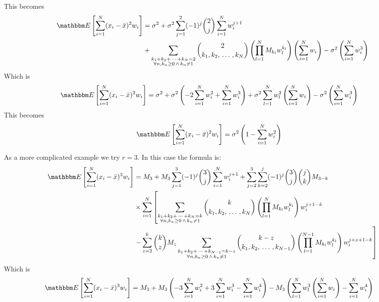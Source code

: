 \documentclass{article}
\newcommand{\E}[1]{\mathbbm E\left[#1\right]}
\begin{document}
This becomes
\begin{align}
    \E{\sum_{i=1}^N (x_i - {\bar x})^2 w_i} &= \sigma^2 + \sigma^2 \sum_{j=1}^2  (-1)^j \binom{2}{j} \sum_{i=1}^N w_i^{j+1} \\\nonumber 
     & + \sum_{\substack{k_1 + k_2 + \, \cdots \, + k_N = 2 \\ \forall n, k_n \ge 0 \, \wedge \, k_n \neq 1 }} \binom{2}{k_1, k_2,\, \ldots\, , k_N} 
     \left(\prod_{l=1}^N M_{k_l} w_l^{k_l}\right) \left(\sum_{i=1}^N w_i \right)  - \sigma^2  \left(\sum_{i=1}^N w_i^{3} \right) 
\end{align}
Which is
\begin{align}
    \E{\sum_{i=1}^N (x_i - {\bar x})^2 w_i} &= \sigma^2 + \sigma^2 \left( -2\sum_{i=1}^N w_i^2 + \sum_{i=1}^N w_i^3\right) 
     +  \sigma^2 \sum_{l=1}^N w_l^2\left(\sum_{i=1}^N w_i\right) - \sigma^2  \left(\sum_{i=1}^N w_i^{3} \right)
\end{align}
This becomes
\begin{align}
    \E{\sum_{i=1}^N (x_i - {\bar x})^2 w_i} &= \sigma^2\left(1 - \sum_{i=1}^N w_i^2\right) 
\end{align}

As a more complicated example we try $r=3$. In this case the formula is:
\begin{align}
    \E{\sum_{i=1}^N (x_i - {\bar x})^3 w_i} &= M_3 + M_3 \sum_{j=1}^3  (-1)^j \binom{3}{j} \sum_{i=1}^N w_i^{j+1} 
    + \sum_{j=2}^3 \sum_{k=2}^j (-1)^j \binom{3}{j} \binom{j}{k} M_{3-k} \\\nonumber 
     & \times \sum_{i=1}^N \left[ \sum_{\substack{k_1 + k_2 + \, \cdots\, + k_N = k \\ \forall n, k_n \ge 0 \, \wedge \, k_n \neq 1 }} \binom{k}{k_1, k_2, \, \ldots\,, k_N} 
     \left(\prod_{l=1}^N M_{k_l} w_l^{k_l}\right) w_i^{j+1-k} \right. \\\nonumber
     &\left. - \sum_{z = 2}^k \binom{k}{z} M_z \sum_{\substack{k_1 + k_2 + \, \cdots\, + k_{N-1} = k-z \\ \forall n, k_n \ge 0\, \wedge\, k_n \neq 1}}
     \binom{k-z}{k_1, k_2, \, \ldots\, , k_{N-1}} \left(\prod_{l=1}^{N-1} M_{k_l} w_l^{k_l} \right) w_i^{j+z+1-k} \right]
\end{align}
Which is
\begin{align}
    \E{\sum_{i=1}^N (x_i - {\bar x})^3 w_i} &= M_3 + M_3 \left(-3 \sum_{i=1}^N w_i^2 + 3 \sum_{i=1}^N w_i^3 - \sum_{i=1}^N w_i^4\right) 
     - M_3 \left(\sum_{l=1}^N w_l^3 \left(\sum_{i=1}^N w_i\right) - \sum_{i=1}^N w_i^4 \right)
\end{align}
\end{document}
